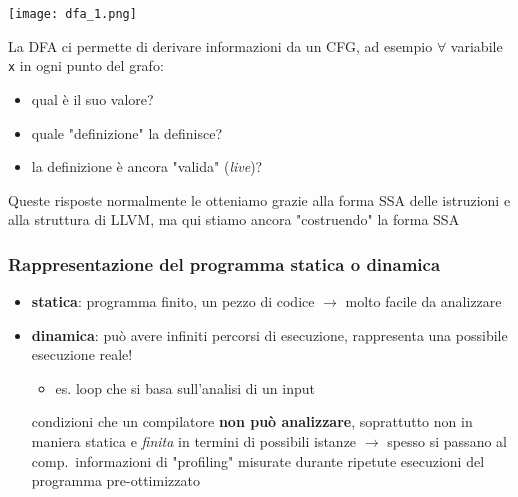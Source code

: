 \begin{example}
	\noindent\begin{minipage}[c]{.3\textwidth}
		\texttt{[image: dfa\_1.png]}
	\end{minipage}\hfill
	\begin{minipage}[c]{.65\textwidth}
		La DFA ci permette di derivare informazioni da un CFG, ad esempio $\forall$ variabile \lstinline|x| in ogni punto del grafo:
		\begin{itemize}
			\item qual \`e il suo valore?
			\item quale "definizione" la definisce?
			\item la definizione \`e ancora "valida" (\textit{live})?
		\end{itemize}
	\end{minipage}

\begin{emphasize}
	Queste risposte normalmente le otteniamo grazie alla forma SSA delle istruzioni e alla struttura di LLVM, ma qui stiamo ancora "costruendo" la forma SSA
\end{emphasize}
\end{example}

\subsubsection{Rappresentazione del programma statica o dinamica}

\begin{itemize}
	\item \textbf{statica}: programma finito, un pezzo di codice $\rightarrow$ molto facile da analizzare
	\item \textbf{dinamica}: pu\`o avere infiniti percorsi di esecuzione, rappresenta una possibile esecuzione reale!
		\begin{itemize}
			\item es. loop che si basa sull'analisi di un input
		\end{itemize}
		\begin{emphasize}
			condizioni che un compilatore \textbf{non pu\`o analizzare}, soprattutto non in maniera statica e \textit{finita} in termini di possibili istanze $\rightarrow$ spesso si passano al comp.~informazioni di "profiling" misurate durante ripetute esecuzioni del programma pre-ottimizzato
		\end{emphasize}
\end{itemize}

